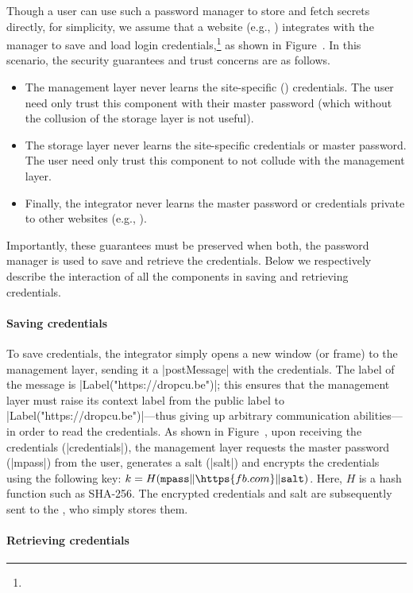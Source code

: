 %
Though a user can use such a password manager to store and fetch
secrets directly, for simplicity, we assume that a website (e.g.,
) integrates with the manager to save and load login
credentials,\footnote{
} as shown in Figure~.
%
In this scenario, the security guarantees and trust concerns are as follows.
\begin{itemize}
\item The management layer never learns the site-specific
  () credentials. The user need only trust this
  component with their master password (which without the collusion
  of the storage layer is not useful).
\item The storage layer never learns the site-specific credentials
  or master password. The user need only trust this component to
  not collude with the management layer.
\item Finally, the integrator never learns the master password or
  credentials private to other websites (e.g., ).
\end{itemize}
%
Importantly, these guarantees must be preserved when both, the
password manager is used to save and retrieve the credentials.
%
Below we respectively describe the interaction of all the components
in saving and retrieving credentials.

\paragraph{Saving credentials}
%
To save credentials, the integrator  simply opens a new
window (or frame) to the  management layer, sending
it a \js|postMessage| with the credentials. 
%
The label of the message is \js|Label("https://dropcu.be")|; this ensures
that the management layer must raise its context label from the public
label to \js|Label("https://dropcu.be")|---thus giving up arbitrary
communication abilities---in order to read the credentials.
%
As shown in Figure~, upon receiving the
credentials (\js|credentials|), the management layer requests the
master password (\js|mpass|) from the user, generates a salt
(\js|salt|) and encrypts the credentials using the following key:
$k = H(\texttt{mpass}\|\https{fb.com}\|\texttt{salt})$.
%
Here, $H$ is a hash function such as SHA-256.
%
The encrypted credentials and salt are subsequently sent to the
, who simply stores them.
%

\paragraph{Retrieving credentials}


